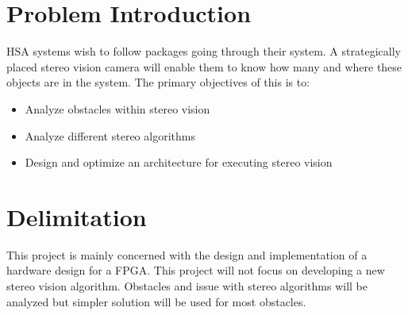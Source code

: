 \section{Problem Introduction}
HSA systems wish to follow packages going through their system. A strategically placed stereo vision camera will enable them to know how many and where these objects are in the system. 
The primary objectives of this is to:
\begin{itemize}
  \item Analyze obstacles within stereo vision
  \item Analyze different stereo algorithms
  \item Design and optimize an architecture for executing stereo vision 
\end{itemize}


\section{Delimitation}
This project is mainly concerned with the design and implementation of a hardware design for a FPGA. This project will not focus on developing a new stereo vision algorithm. Obstacles and issue with stereo algorithms will be analyzed but simpler solution will be used for most obstacles.

